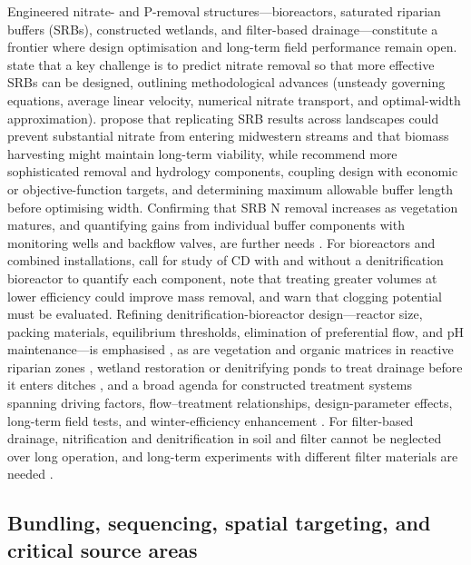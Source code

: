 Engineered nitrate- and P-removal structures---bioreactors, saturated riparian buffers (SRBs), constructed wetlands, and filter-based drainage---constitute a frontier where design optimisation and long-term field performance remain open. \textcite{McEachran2020} state that a key challenge is to predict nitrate removal so that more effective SRBs can be designed, outlining methodological advances (unsteady governing equations, average linear velocity, numerical nitrate transport, and optimal-width approximation). \textcite{Jaynes2014} propose that replicating SRB results across landscapes could prevent substantial nitrate from entering midwestern streams and that biomass harvesting might maintain long-term viability, while \textcite{Abdalaal2023} recommend more sophisticated removal and hydrology components, coupling design with economic or objective-function targets, and determining maximum allowable buffer length before optimising width. Confirming that SRB N removal increases as vegetation matures, and quantifying gains from individual buffer components with monitoring wells and backflow valves, are further needs \parencite{Jaynes2019,Singh2024b}. For bioreactors and combined installations, \textcite{Husk2017} call for study of CD with and without a denitrification bioreactor to quantify each component, note that treating greater volumes at lower efficiency could improve mass removal, and warn that clogging potential must be evaluated. Refining denitrification-bioreactor design---reactor size, packing materials, equilibrium thresholds, elimination of preferential flow, and pH maintenance---is emphasised \parencite{Aide2016}, as are vegetation and organic matrices in reactive riparian zones \parencite{Vallée2014}, wetland restoration or denitrifying ponds to treat drainage before it enters ditches \parencite{Randall2001}, and a broad agenda for constructed treatment systems spanning driving factors, flow--treatment relationships, design-parameter effects, long-term field tests, and winter-efficiency enhancement \parencite{Mendes2021}. For filter-based drainage, nitrification and denitrification in soil and filter cannot be neglected over long operation, and long-term experiments with different filter materials are needed \parencite{Tao2022}.

\subsection{Bundling, sequencing, spatial targeting, and critical source areas}

